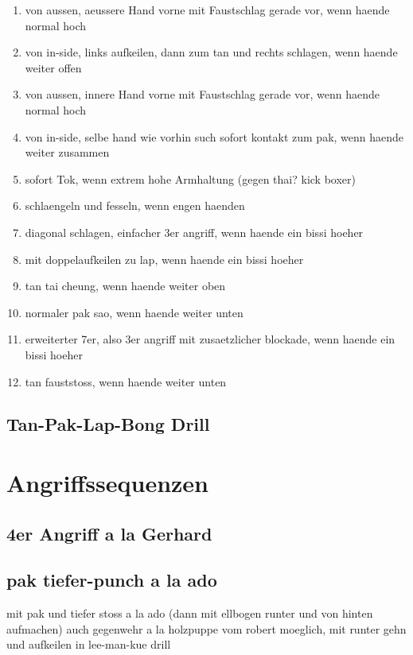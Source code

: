 \begin{enumerate}
	\item von aussen, aeussere Hand vorne mit Faustschlag gerade vor, wenn haende normal hoch
	\item von in-side, links aufkeilen, dann zum tan und rechts schlagen, wenn haende weiter offen
	\item von aussen, innere Hand vorne mit Faustschlag gerade vor, wenn haende normal hoch
	\item von in-side, selbe hand wie vorhin such sofort kontakt zum pak, wenn haende weiter zusammen
	\item sofort Tok, wenn extrem hohe Armhaltung (gegen thai? kick boxer)
	\item schlaengeln und fesseln, wenn engen haenden
	\item diagonal schlagen, einfacher 3er angriff, wenn haende ein bissi hoeher
	\item mit doppelaufkeilen zu lap, wenn haende ein bissi hoeher
	\item tan tai cheung, wenn haende weiter oben
	\item normaler pak sao, wenn haende weiter unten
	\item erweiterter 7er, also 3er angriff mit zusaetzlicher blockade, wenn haende ein bissi hoeher
	\item tan fauststoss, wenn haende weiter unten
\end{enumerate}

\subsection{Tan-Pak-Lap-Bong Drill}


\section{Angriffssequenzen}

\subsection{4er Angriff a la Gerhard}

\subsection{pak tiefer-punch a la ado}
mit pak und tiefer stoss a la ado (dann mit ellbogen runter und von hinten aufmachen)
auch gegenwehr a la holzpuppe vom robert moeglich, mit runter gehn und aufkeilen in lee-man-kue drill

